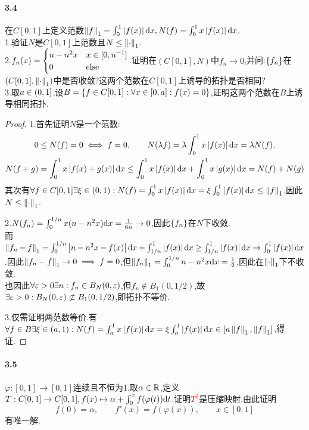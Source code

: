 \documentclass[UTF8]{article}
\begin{document}
\paragraph*{3.4}在$C[0,1]$上定义范数$\left\|f\right\|_1=\int_0^1 \left|f(x)\right|\mathrm{d} x, N(f)=\int_0^1 x\left|f(x)\right|\mathrm{d} x$.\\
1.验证$N$是$C[0,1]$上范数且$N\leq \left\|\cdot\right\|_1$.\\
2.$f_n(x)=\begin{cases}
    n-n^2x&x\in [0,n^{-1}\!\,]\\
    0& \text{else}
\end{cases}$.证明在$(C[0,1],N)$中$f_n\to 0$,并问:$\left\{f_n\right\}$在$(C[0,1],\left\|\cdot\right\|_1)$中是否收敛?这两个范数在$C[0,1]$上诱导的拓扑是否相同?\\
3.取$a\in \left(0,1\right]$,设$B=\left\{f\in C[0,1]:\forall x\in [0,a]:f(x)=0\right\}$,证明这两个范数在$B$上诱导相同拓扑.

\begin{proof}
    1.首先证明$N$是一个范数:$$\begin{gathered}
        0\leq N(f)=0\iff f=0,\qquad N(\lambda f)=\lambda\int_0^1 x\left|f(x)\right|\mathrm{d} x=\lambda N(f),\\ 
        N(f+g)=\int_0^1 x\left|f(x)+g(x)\right|\mathrm{d} x\leq \int_0^1 x\left|f(x)\right|\mathrm{d} x+\int_0^1 x\left|g(x)\right|\mathrm{d} x=N(f)+N(g)
    \end{gathered}$$
    其次有$\forall f\in C[0,1]\exists \xi\in (0,1):N(f)=\int_0^1 x\left|f(x)\right|\mathrm{d} x=\xi\int_0^1\left|f(x)\right|\mathrm{d} x\leq \left\|f\right\|_1$,因此$N\leq \left\|\cdot\right\|_1$.

    2.$N(f_n)=\int_0^{1/n}x(n-n^2x)\mathrm{d} x=\frac{1}{6n}\to 0$,因此$\left\{f_n\right\}$在$N$下收敛.\\
    而$\left\|f_n-f\right\|_1=\int_0^{1/n}\left|n-n^2x-f(x)\right|\mathrm{d} x+\int_{1/n}^1\left|f(x)\right|\mathrm{d} x\geq \int_{1/n}^1\left|f(x)\right|\mathrm{d} x\to \int_0^1\left|f(x)\right|\mathrm{d} x$.因此$\left\|f_n-f\right\|_1\to 0\implies f=0$,但$\left\|f_n\right\|_1=\int_0^{1/n}n-n^2x\mathrm{d} x=\frac{1}{2}$,因此在$\left\|\cdot\right\|_1$下不收敛.\\
    也因此$\forall \varepsilon>0\exists n:f_n\in B_N(0,\varepsilon)$,但$f_n\notin B_1(0,1/2)$,故$\exists \varepsilon>0:B_N(0,\varepsilon)\not\subset B_1(0,1/2)$,即拓扑不等价.

    3.仅需证明两范数等价.有$\forall f\in B\exists \xi\in (a,1):N(f)=\int_a^1 x\left|f(x)\right|\mathrm{d} x=\xi\int_a^1\left|f(x)\right|\mathrm{d} x\in \left[a\left\|f\right\|_1,\left\|f\right\|_1\right]$,得证.
\end{proof}

\paragraph*{3.5}$\varphi:[0,1]\to [0,1]$连续且不恒为1.取$\alpha\in \mathbb{R}$,定义$T:C[0,1]\to C[0,1], f(x)\mapsto \alpha+\int_0^x f(\varphi(t))\mathrm{d} t$.证明\textcolor{red}{$T^2$}是压缩映射.由此证明$$f(0)=\alpha,\qquad f'(x)=f(\varphi(x)),\qquad x\in [0,1]$$有唯一解.
\end{document}
